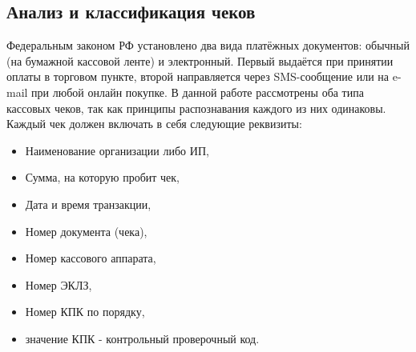 \documentclass[14pt]{mmcs_article}
\begin{document}
\subsection{Анализ и классификация чеков}
Федеральным законом РФ установлено два вида платёжных документов: обычный (на бумажной кассовой ленте) и электронный. Первый выдаётся при принятии оплаты в торговом пункте, второй направляется через SMS-сообщение или на e-mail при любой онлайн покупке. В данной работе рассмотрены оба типа кассовых чеков, так как принципы распознавания каждого из них одинаковы. Каждый чек должен включать в себя следующие реквизиты:
\begin{itemize}
\item Наименование организации либо ИП,
\item Сумма, на которую пробит чек,
\item Дата и время транзакции,
\item Номер документа (чека),
\item Номер кассового аппарата,
\item Номер ЭКЛЗ,
\item Номер КПК по порядку,
\item значение КПК - контрольный проверочный код.
\end{itemize}
\end{document}
